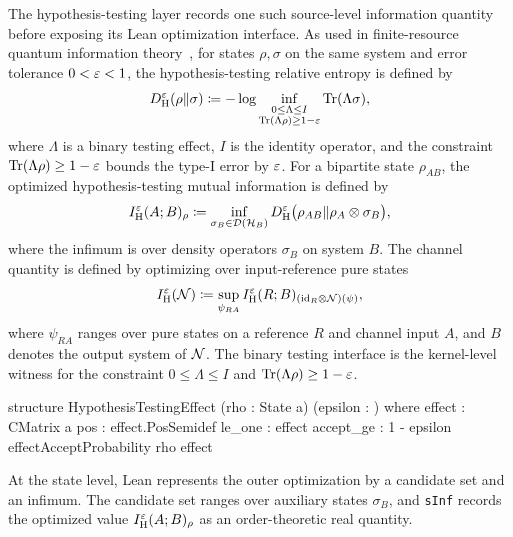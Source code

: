 \documentclass[10pt,a4paper]{article}
\newif\ifqitLineFocused
\newcommand{\qitHighlightSpan}[2]{%
	\ifnum\value{lstnumber}<#1\relax
	\else
		\ifnum\value{lstnumber}>#2\relax
		\else
			\qitLineFocusedtrue
		\fi
	\fi
}
\begin{document}
The hypothesis-testing layer records one such source-level information quantity before exposing its Lean optimization interface.  As used in
finite-resource quantum information theory~\cite{Tomamichel2015,Wilde2017}, for states $\rho,\sigma$ on the same system and error tolerance $0<\varepsilon<1$, the hypothesis-testing relative entropy is defined by
\begin{equation}
        D_{\mathrm H}^{\varepsilon}(\rho\Vert\sigma)
        \coloneqq-\log
        \inf_{\substack{0\le \Lambda \le I\\
                \operatorname{Tr}(\Lambda\rho)\ge 1-\varepsilon}}
        \operatorname{Tr}(\Lambda\sigma),
\end{equation}
where $\Lambda$ is a binary testing effect, $I$ is the identity operator, and the constraint $\operatorname{Tr}(\Lambda\rho)\ge1-\varepsilon$ bounds the type-I error by $\varepsilon$. For a bipartite state $\rho_{AB}$, the optimized hypothesis-testing mutual information is defined by
\begin{equation}
    I_{\mathrm H}^{\varepsilon}(A;B)_\rho
    \coloneqq
    \inf_{\sigma_B \in \mathcal D(\mathcal H_B)}
    D_{\mathrm H}^{\varepsilon}
    \bigl(\rho_{AB}\Vert \rho_A\otimes\sigma_B\bigr),
\end{equation}
where the infimum is over density operators $\sigma_B$ on system $B$.
The channel quantity is defined by optimizing over input-reference pure states
\begin{equation}
        I_{\mathrm H}^{\varepsilon}({\cal N})
        \coloneqq
        \sup_{\psi_{RA}}
        I_{\mathrm H}^{\varepsilon}(R;B)_
        {({\operatorname{id}}_R\otimes {\cal N})(\psi)},
\end{equation}
where $\psi_{RA}$ ranges over pure states on a reference $R$ and channel
input $A$, and $B$ denotes the output system of ${\cal N}$.
The binary testing interface is the kernel-level witness for the constraint
$0\le\Lambda\le I$ and $\operatorname{Tr}(\Lambda\rho)\ge 1-\varepsilon$.
	
\begin{qitleancode}[title={Feasible hypothesis-testing effects},
qit focus={\qitHighlightSpan{3}{5}}]
structure HypothesisTestingEffect (rho : State a) (epsilon : \mathbbR) where
  effect : CMatrix a
  pos : effect.PosSemidef
  le_one : effect 
  accept_ge : 1 - epsilon \le effectAcceptProbability rho effect
\end{qitleancode}
	
	At the state level, Lean represents the outer optimization by a candidate set
	and an infimum.  The candidate set ranges over auxiliary states
	$\sigma_B$, and \texttt{sInf} records the optimized value
	$I_{\mathrm H}^{\varepsilon}(A;B)_\rho$ as an order-theoretic real quantity.
	
\end{document}

